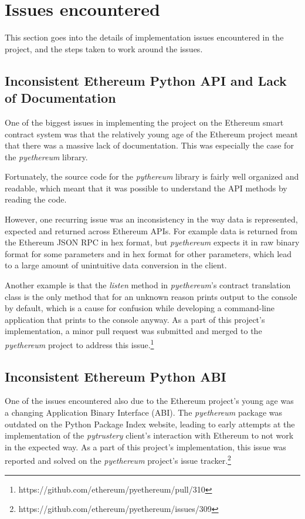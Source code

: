 \documentclass[12pt,a4paper]{report}
\begin{document}
	\section{Issues encountered}
	This section goes into the details of implementation issues encountered in the project, and the steps taken to work around the issues.
	
	\subsection{Inconsistent Ethereum Python API and Lack of Documentation}
	One of the biggest issues in implementing the project on the Ethereum smart contract system was that the relatively young age of the Ethereum project meant that there was a massive lack of documentation. This was especially the case for the \textit{pyethereum} library.
	
	Fortunately, the source code for the \textit{pythereum} library is fairly well organized and readable, which meant that it was possible to understand the API methods by reading the code.
	
	However, one recurring issue was an inconsistency in the way data is represented, expected and returned across Ethereum APIs. For example data is returned from the Ethereum JSON RPC in hex format, but \textit{pyethereum} expects it in raw binary format for some parameters and in hex format for other parameters, which lead to a large amount of unintuitive data conversion in the client.
	
	Another example is that the \textit{listen} method in \textit{pyethereum}'s contract translation class is the only method that for an unknown reason prints output to the console by default, which is a cause for confusion while developing a command-line application that prints to the console anyway. As a part of this project's implementation, a minor pull request was submitted and merged to the \textit{pyethereum} project to address this issue.\footnote{https://github.com/ethereum/pyethereum/pull/310}
	
	\subsection{Inconsistent Ethereum Python ABI}
	One of the issues encountered also due to the Ethereum project's young age was a changing Application Binary Interface (ABI). The \textit{pyethereum} package was outdated on the Python Package Index website, leading to early attempts at the implementation of the \textit{pytrustery} client's interaction with Ethereum to not work in the expected way. As a part of this project's implementation, this issue was reported and solved on the \textit{pyethereum} project's issue tracker.\footnote{https://github.com/ethereum/pyethereum/issues/309}
	
\end{document}
